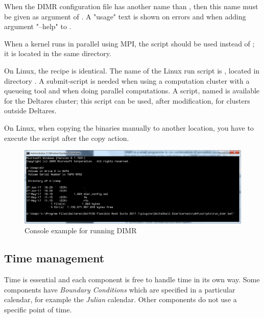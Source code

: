 \documentclass[signature]{deltares_manual}
\newcommand{\dimr}{\textrm{DIMR}\xspace}
\begin{document}
\Note When the \dimr configuration file has another name than , then this name must be given as argument of . A "usage" text is shown on errors and when adding argument "--help" to .

\Note When a kernel runs in parallel using MPI, the script  should be used instead of ; it is located in the same directory.

\Note On Linux, the recipe is identical. The name of the Linux run script is , located in directory . A submit-script is needed when using a computation cluster with a queueing tool and when doing parallel computations. A script, named  is available for the Deltares cluster; this script can be used, after modification, for clusters outside Deltares.

\Note On Linux, when copying the binaries manually to another location, you have to execute the script  after the copy action.

\begin{figure}[h]
	\centering
	\includegraphics[width=15cm] {pictures/dimrconsole.png}
	\caption{Console example for running DIMR} 
	\label{fig:dimrconsole}
\end{figure}

\subsection{Time management}
\label{subsec:timemanagement}
Time is essential and each component is free to handle time in its own way. Some components have \textit{Boundary Conditions} which are specified in a particular calendar, for example the \textit{Julian} calendar. Other components do not use a specific point of time.
\end{document}
